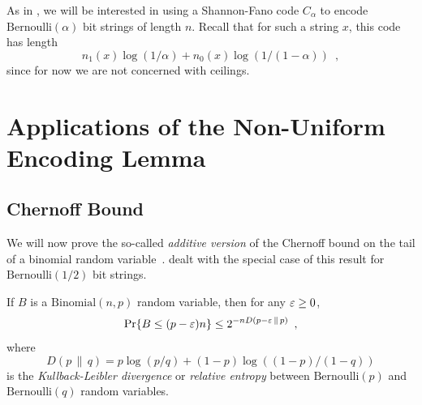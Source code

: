 \documentclass[format=acmsmall, review=false, screen=true]{acmart}
\begin{document}
As in , we will be interested in using a
Shannon-Fano code $C_\alpha$ to encode $\mathrm{Bernoulli}(\alpha)$
bit strings of length $n$. Recall that for such a string $x$, this
code has length
\[
  n_1(x) \log (1/\alpha) + n_0(x) \log(1/(1 - \alpha)) \enspace ,
\]
since for now we are not concerned with ceilings.

\section{Applications of the Non-Uniform Encoding Lemma}

\subsection{Chernoff Bound}

We will now prove the so-called \emph{additive version} of the
Chernoff bound on the tail of a binomial random
variable~\cite{chernoff:bound}.  dealt with
the special case of this result for $\mathrm{Bernoulli}(1/2)$ bit
strings.

\begin{thm}
  If $B$ is a $\mathrm{Binomial}(n,p)$ random variable, then for any
  $\varepsilon \geq 0$,
  \[
    \Pr\{B\le(p-\varepsilon)n\} \le 2^{-nD(p-\varepsilon \,\|\, p)} \enspace ,
  \]
  where 
  \[ 
    D(p\, \|\, q)= p\log (p/q) + (1-p)\log ((1 - p)/(1 - q))
  \]
  is the \emph{Kullback-Leibler divergence} or \emph{relative entropy}
  between $\mathrm{Bernoulli}(p)$ and $\mathrm{Bernoulli}(q)$ random
  variables.
\end{thm}
\end{document}
